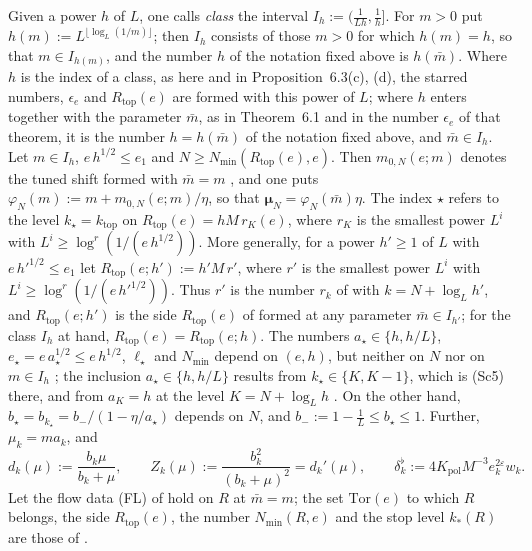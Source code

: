 \documentclass[11pt,letterpaper,reqno]{amsart}
\theoremstyle{definition}
\begin{document}
Given a power $h$ of $L$, one calls \emph{class} the interval $I_h:=(\frac1{Lh},\frac1h]$.
For $m>0$ put $h(m):=L^{\lfloor\log_L(1/m)\rfloor}$;
then $I_h$ consists of those $m>0$ for which $h(m)=h$, so that $m\in I_{h(m)}$, and the number $h$ of the notation fixed above is $h(\bar m)$.
Where $h$ is the index of a class, as here and in Proposition~6.3(c), (d), the starred numbers, $\epsilon_e$ and $R_{\mathrm{top}}(e)$ are formed with this power of $L$;
where $h$ enters together with the parameter $\bar m$, as in Theorem~6.1 and in the number $\epsilon_e$ of that theorem, it is the number $h=h(\bar m)$ of the notation fixed above, and $\bar m\in I_h$.
Let $m\in I_h$, $e\,h^{1/2}\le e_1$ and $N\ge N_{\min}(R_{\mathrm{top}}(e),e)$.
Then $m_{0,N}(e;m)$ denotes the tuned shift formed with $\bar m=m$ \cite[Definition before Proposition~28.3]{QEDIII}, and one puts $\varphi_N(m):=m+m_{0,N}(e;m)/\eta$, so that $\boldsymbol\mu_N=\varphi_N(\bar m)\eta$.
The index $\star$ refers to the level $k_\star=k_{\mathrm{top}}$ on $R_{\mathrm{top}}(e)=hM\,r_K(e)$, where $r_K$ is the smallest power $L^i$ with $L^i\ge\log^r(1/(e\,h^{1/2}))$.
More generally, for a power $h'\ge1$ of $L$ with $e\,h'^{1/2}\le e_1$ let $R_{\mathrm{top}}(e;h'):=h'M\,r'$, where $r'$ is the smallest power $L^i$ with $L^i\ge\log^r(1/(e\,h'^{1/2}))$.
Thus $r'$ is the number $r_k$ of \cite[Section~I.6.1]{QEDIII} with $k=N+\log_Lh'$, and $R_{\mathrm{top}}(e;h')$ is the side $R_{\mathrm{top}}(e)$ of \cite[Section~I.6.2]{QEDIII} formed at any parameter $\bar m\in I_{h'}$;
for the class $I_h$ at hand, $R_{\mathrm{top}}(e)=R_{\mathrm{top}}(e;h)$.
The numbers $a_\star\in\{h,h/L\}$, $e_\star=e\,a_\star^{1/2}\le e\,h^{1/2}$, $\ell_\star$ and $N_{\min}$ depend on $(e,h)$, but neither on $N$ nor on $m\in I_h$ \cite[Section~G4.0.2, (Sc0), (Sc1), (Sc5)]{QEDIII};
the inclusion $a_\star\in\{h,h/L\}$ results from $k_\star\in\{K,K-1\}$, which is (Sc5) there, and from $a_K=h$ at the level $K=N+\log_Lh$ \cite[Section~I.6.1]{QEDIII}.
On the other hand, $b_\star=b_{k_\star}=b_-/(1-\eta/a_\star)$ depends on $N$, and $b_-:=1-\frac1L\le b_\star\le1$.
Further, $\mu_k=ma_k$, and
\begin{equation*}
d_k(\mu):=\frac{b_k\mu}{b_k+\mu},\qquad Z_k(\mu):=\frac{b_k^2}{(b_k+\mu)^2}=d_k'(\mu),\qquad\delta^\flat_k:=4K_{\mathrm{pol}}M^{-3}e_k^{2\varepsilon}w_k.
\end{equation*}
Let the flow data (FL) of \cite[Sections~I.1.8 and~G4.0.1]{QEDIII} hold on $R$ at $\bar m=m$;
the set $\mathrm{Tor}(e)$ to which $R$ belongs, the side $R_{\mathrm{top}}(e)$, the number $N_{\min}(R,e)$ and the stop level $k_*(R)$ are those of \cite[Section~I.6.2]{QEDIII}.
\end{document}
